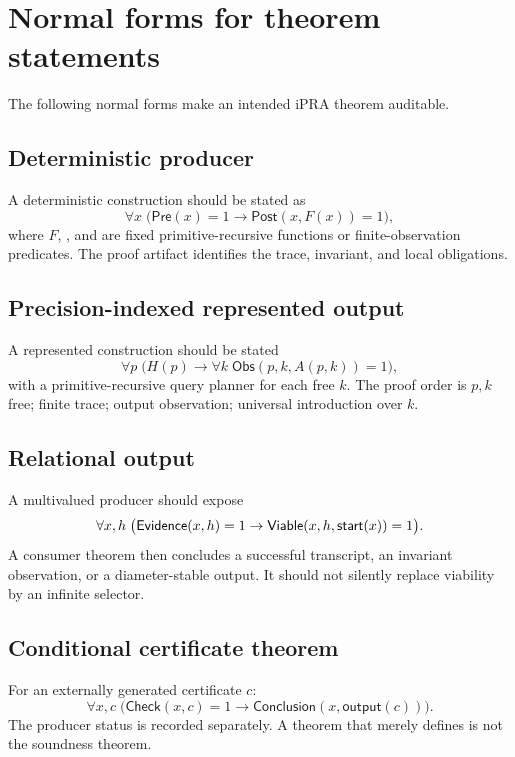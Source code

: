 \section{Normal forms for theorem statements}
\label{app:normal-forms}

The following normal forms make an intended iPRA theorem auditable.

\subsection{Deterministic producer}

A deterministic construction should be stated as
\[
 \forall x\;\bigl(\mathsf{Pre}(x)=1\to
 \mathsf{Post}(x,F(x))=1\bigr),
\]
where $F$, , and  are fixed primitive-recursive functions or finite-observation predicates.  The proof artifact identifies the trace, invariant, and local obligations.

\subsection{Precision-indexed represented output}

A represented construction should be stated
\[
 \forall p\;\bigl(H(p)\to\forall k\;
 \mathsf{Obs}(p,k,A(p,k))=1\bigr),
\]
with a primitive-recursive query planner for each free $k$.  The proof order is $p,k$ free; finite trace; output observation; universal introduction over $k$.

\subsection{Relational output}

A multivalued producer should expose
\[
 \forall x,h\;\bigl(\mathsf{Evidence}(x,h)=1\to
 \mathsf{Viable}(x,h,\mathsf{start}(x))=1\bigr).
\]
A consumer theorem then concludes a successful transcript, an invariant observation, or a diameter-stable output.  It should not silently replace viability by an infinite selector.

\subsection{Conditional certificate theorem}

For an externally generated certificate $c$:
\[
 \forall x,c\;\bigl(\mathsf{Check}(x,c)=1\to
 \mathsf{Conclusion}(x,\mathsf{output}(c))\bigr).
\]
The producer status is recorded separately.  A theorem that merely defines  is not the soundness theorem.

